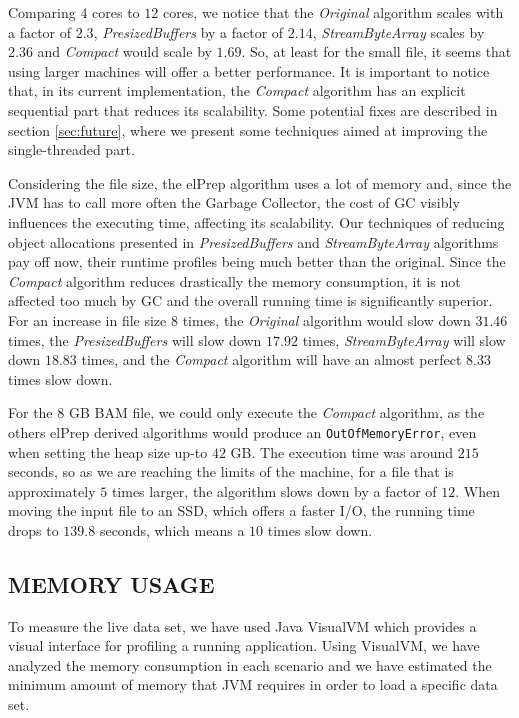 \documentclass[a4paper,twoside]{article}
\begin{document}
{Comparing $4$ cores to $12$ cores, we notice that the {\textit{Original} } algorithm scales with a factor of $2.3$, {\textit{PresizedBuffers} } by a factor of $2.14$, {\textit{StreamByteArray} } scales by $2.36$ and {\textit{Compact} } would scale by $1.69$. So, at least for the small file, it seems that using larger machines will offer a better performance. It is important to notice that, in its current implementation, the {\textit{Compact} } algorithm has an explicit sequential part that reduces its scalability.
Some potential fixes are described in section \ref{sec:future}, where we present some techniques aimed at improving the single-threaded part.

Considering the file size, the elPrep algorithm uses a lot of memory and, since the JVM has to call more often the Garbage Collector, the cost of GC visibly influences the executing time, affecting its scalability. Our techniques of reducing object allocations presented in {\textit{PresizedBuffers} } and {\textit{StreamByteArray} } algorithms pay off now, their runtime profiles being much better than the original. Since the {\textit{Compact} } algorithm reduces drastically the memory consumption, it is not affected too much by GC and the overall running time is significantly superior.
For an increase in file size $8$ times, the {\textit{Original} } algorithm would slow down $31.46$ times, the {\textit{PresizedBuffers} } will slow down $17.92$ times, {\textit{StreamByteArray} } will slow down $18.83$ times,
and the {\textit{Compact} } algorithm will have an almost perfect $8.33$ times slow down.

For the $8$ GB BAM file, we could only execute the {\textit{Compact} } algorithm, as the others elPrep derived algorithms would produce an \texttt{OutOfMemoryError}, even when setting the heap size up-to $42$ GB.
The execution time was around $215$ seconds, so as we are reaching the limits of the machine, for a file that is approximately $5$ times larger, the algorithm slows down by a factor of $12$. When moving the input file to an SSD, which offers a faster I/O, the running time drops to $139.8$ seconds, which means a $10$ times slow down.

\subsection{\uppercase{Memory Usage}}
\label{subsec:memusage}
To measure the live data set, we have used Java VisualVM \cite{visualvm:oracle} which provides a visual interface for profiling a running application. Using VisualVM, we have analyzed the memory consumption in each scenario and we have estimated the minimum amount of memory that JVM requires in order to load a specific data set.

}
\end{document}

